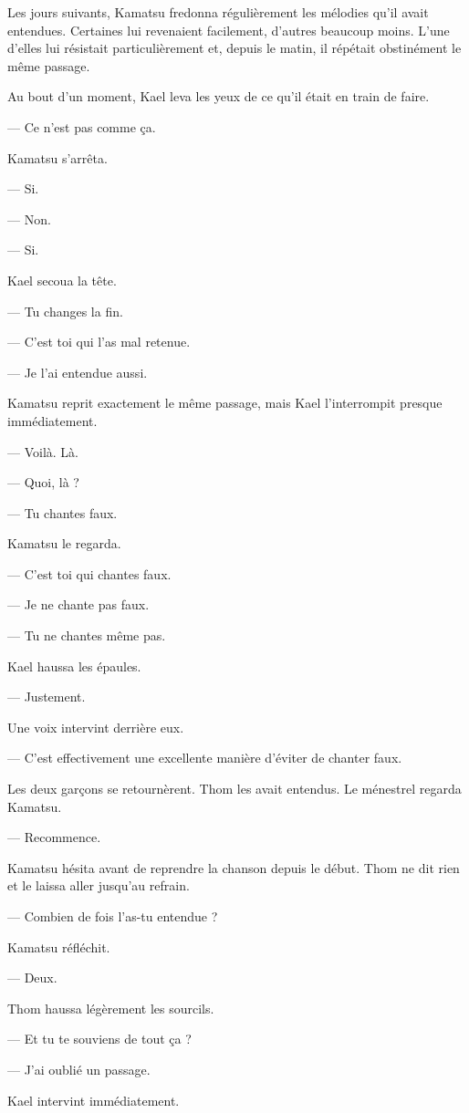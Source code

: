 Les jours suivants, Kamatsu fredonna régulièrement les mélodies qu'il avait
entendues. Certaines lui revenaient facilement, d'autres beaucoup moins. L'une
d'elles lui résistait particulièrement et, depuis le matin, il répétait
obstinément le même passage.

Au bout d'un moment, Kael leva les yeux de ce qu'il était en train de faire.

— Ce n'est pas comme ça.

Kamatsu s'arrêta.

— Si.

— Non.

— Si.

Kael secoua la tête.

— Tu changes la fin.

— C'est toi qui l'as mal retenue.

— Je l'ai entendue aussi.

Kamatsu reprit exactement le même passage, mais Kael l'interrompit presque
immédiatement.

— Voilà. Là.

— Quoi, là ?

— Tu chantes faux.

Kamatsu le regarda.

— C'est toi qui chantes faux.

— Je ne chante pas faux.

— Tu ne chantes même pas.

Kael haussa les épaules.

— Justement.

Une voix intervint derrière eux.

— C'est effectivement une excellente manière d'éviter de chanter faux.

Les deux garçons se retournèrent. Thom les avait entendus. Le ménestrel regarda
Kamatsu.

— Recommence.

Kamatsu hésita avant de reprendre la chanson depuis le début. Thom ne dit rien
et le laissa aller jusqu'au refrain.

— Combien de fois l'as-tu entendue ?

Kamatsu réfléchit.

— Deux.

Thom haussa légèrement les sourcils.

— Et tu te souviens de tout ça ?

— J'ai oublié un passage.

Kael intervint immédiatement.

